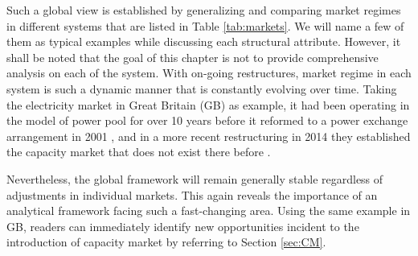 Such a global view is established by generalizing and comparing market regimes in different systems that are listed in Table \ref{tab:markets}. We will name a few of them as typical examples while discussing each structural attribute. However, it shall be noted that the goal of this chapter is not to provide comprehensive analysis on each of the system. With on-going restructures, market regime in each system is such a dynamic manner that is constantly evolving over time. Taking the electricity market in Great Britain (GB) as example, it had been operating in the model of power pool for over 10 years before it reformed to a power exchange arrangement in 2001 \cite{Rebours2009,FrontierEconomics2016,ofgem_m}, and in a more recent restructuring in 2014 they established the capacity market that does not exist there before \cite{ofgem_cm}. 

Nevertheless, the global framework will remain generally stable regardless of adjustments in individual markets. This again reveals the importance of an analytical framework facing such a fast-changing area. Using the same example in GB, readers can immediately identify new opportunities incident to the introduction of capacity market by referring to Section \ref{sec:CM}.


